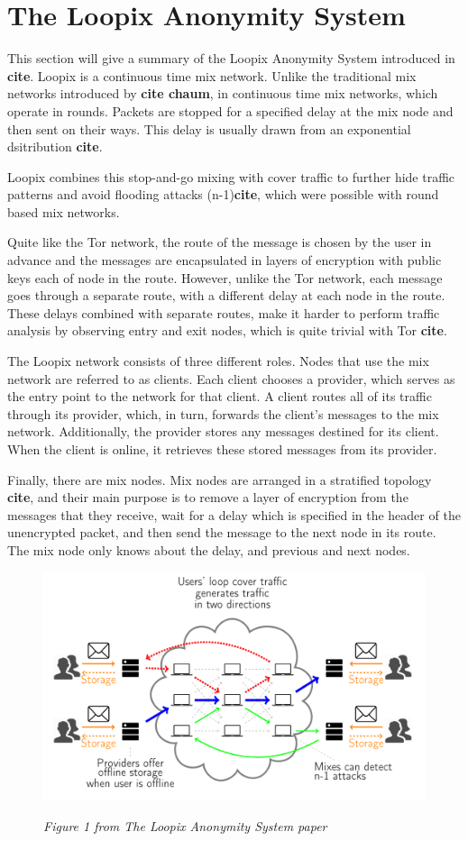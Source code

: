 \documentclass[a4paper,11pt,oneside]{report}
\begin{document}
\section{The Loopix Anonymity System}
This section will give a summary of the Loopix Anonymity System introduced in \textbf{cite}. Loopix is a continuous time mix network. Unlike the traditional mix networks introduced by \textbf{cite chaum}, in continuous time mix networks, which operate in rounds. Packets are stopped for a specified delay at the mix node and then sent on their ways. This delay is usually drawn from an exponential dsitribution \textbf{cite}.

Loopix combines this stop-and-go mixing with cover traffic to further hide traffic patterns and avoid flooding attacks (n-1)\textbf{cite}, which were possible with round based mix networks.

Quite like the Tor network, the route of the message is chosen by the user in advance and the messages are encapsulated in layers of encryption with public keys each of node in the route. However, unlike the Tor network, each message goes through a separate route, with a different delay at each node in the route. These delays combined with separate routes, make it harder to perform traffic analysis by observing entry and exit nodes, which is quite trivial with Tor \textbf{cite}.

The Loopix network consists of three different roles. Nodes that use the mix network are referred to as clients. Each client chooses a provider, which serves as the entry point to the network for that client. A client routes all of its traffic through its provider, which, in turn, forwards the client’s messages to the mix network. Additionally, the provider stores any messages destined for its client. When the client is online, it retrieves these stored messages from its provider.

Finally, there are mix nodes. Mix nodes are arranged in a stratified topology \textbf{cite}, and their main purpose is to remove a layer of encryption from the messages that they receive, wait for a delay which is specified in the header of the unencrypted packet, and then send the message to the next node in its route. The mix node only knows about the delay, and previous and next nodes.

\begin{figure}[H]
    \centering
    \includegraphics[width=0.8\linewidth]{plots/loopix.png}
    \caption{}
    \label{fig:loopix}
    \small\textit{Figure 1 from The Loopix Anonymity System paper}
\end{figure}
\end{document}
